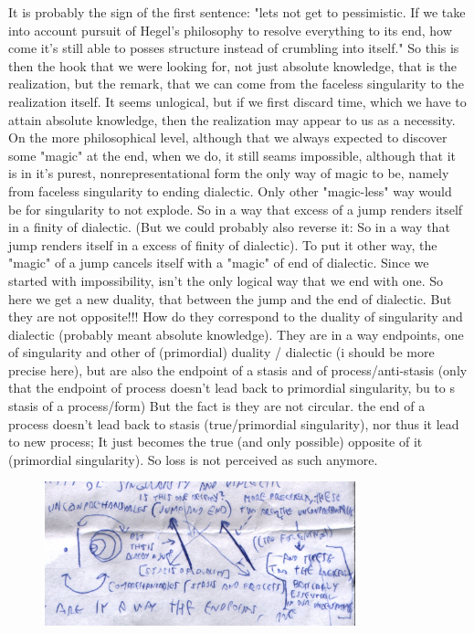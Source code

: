 \documentclass[10pt]{book}
\begin{document}
It is probably the sign of the first sentence: "lets not get to pessimistic. If we take into account pursuit of Hegel's philosophy to resolve everything to its end, how come it's still able to posses structure instead of crumbling into itself." So this is then the hook that we were looking for, not just absolute knowledge, that is the realization, but the remark, that we can come from the faceless singularity to the realization itself. It seems unlogical, but if we first discard time, which we have to attain absolute knowledge, then the realization may appear to us as a necessity. On the more philosophical level, although that we always expected to discover some "magic" at the end, when we do, it still seams impossible, although that it is in it's purest, nonrepresentational form the only way of magic to be, namely from faceless singularity to ending dialectic. Only other "magic-less" way would be for singularity to not explode. So in a way that excess of a jump renders itself in a finity of dialectic. (But we could probably also reverse it: So in a way that jump renders itself in a excess of finity of dialectic). To put it other way, the "magic" of a jump cancels itself with a "magic" of end of dialectic. Since we started with impossibility, isn't the only logical way that we end with one. 
So here we get a new duality, that between the jump and the end of dialectic. But they are not opposite!!! How do they correspond to the duality of singularity and dialectic (probably meant absolute knowledge). They are in a way endpoints, one of singularity and other of (primordial) duality / dialectic (i should be more precise here), but are also the endpoint of a stasis and of process/anti-stasis (only that the endpoint of process doesn't lead back to primordial singularity, bu to s stasis of a process/form) But the fact is they are not circular. the end of a process doesn't lead back to stasis (true/primordial singularity), nor thus it lead to new process; It just becomes the true (and only possible) opposite of it (primordial singularity). So loss is not perceived as such anymore. 

\begin{figure}[ht!]
\centering
\includegraphics[width=90mm]{scan02.jpg}
\label{overflow}
\end{figure}
\end{document}
